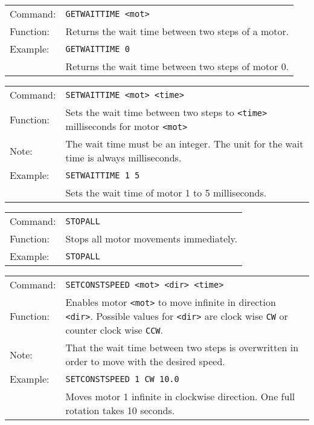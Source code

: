 \vspace{\vdistace}

\begin{table}[!htbp]
  \begin{tabularx}{\textwidth}{lX}
    Command:  & \texttt{GETWAITTIME <mot>}\\
    Function: & Returns the wait time between two steps of a motor.\\
    Example:  & \texttt{GETWAITTIME 0}\\
              & Returns the wait time between two steps of motor 0.
  \end{tabularx}
\end{table}

\vspace{\vdistace}

\begin{table}[!htbp]
  \begin{tabularx}{\textwidth}{lX}
    Command:  & \texttt{SETWAITTIME <mot> <time>}\\
    Function: & Sets the wait time between two steps to \texttt{<time>} milliseconds
                for motor \texttt{<mot>}\\
    Note:     & The wait time must be an integer. The unit for the wait time
                is always milliseconds.\\
    Example:  & \texttt{SETWAITTIME 1 5}\\
              & Sets the wait time of motor 1 to 5 milliseconds.
  \end{tabularx}
\end{table}

\vspace{\vdistace}

\begin{table}[!htbp]
  \begin{tabularx}{\textwidth}{lX}
    Command:  & \texttt{STOPALL}\\
    Function: & Stops all motor movements immediately.\\
    Example:  & \texttt{STOPALL}
  \end{tabularx}
\end{table}

\vspace{\vdistace}

\begin{table}[!htbp]
  \begin{tabularx}{\textwidth}{lX}
    Command:  & \texttt{SETCONSTSPEED <mot> <dir> <time>}\\
    Function: & Enables motor \texttt{<mot>} to move infinite in direction \texttt{<dir>}.
                Possible values for \texttt{<dir>} are clock wise \texttt{CW} or
                counter clock wise \texttt{CCW}. \\
    Note:     & That the wait time between two steps is overwritten in order to move with the desired speed.\\
    Example:  & \texttt{SETCONSTSPEED 1 CW 10.0}\\
              & Moves motor 1 infinite in clockwise direction.
                One full rotation takes 10 seconds.
  \end{tabularx}
\end{table}

